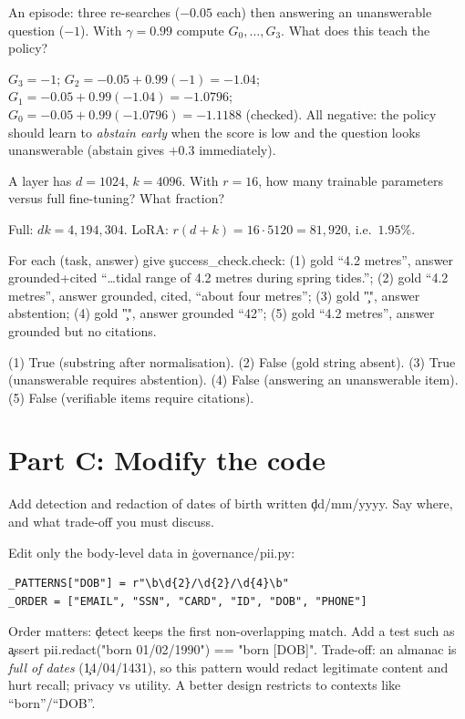 \begin{problem}[RL return]
An episode: three re-searches ($-0.05$ each) then answering an unanswerable question ($-1$). With $\gamma=0.99$ compute $G_0,\dots,G_3$. What does this teach the policy?
\end{problem}
\begin{solution}
$G_3=-1$; $G_2=-0.05+0.99(-1)=-1.04$; $G_1=-0.05+0.99(-1.04)=-1.0796$; $G_0=-0.05+0.99(-1.0796)=-1.1188$ (checked). All negative: the policy should learn to \emph{abstain early} when the score is low and the question looks unanswerable (abstain gives $+0.3$ immediately).
\end{solution}

\begin{problem}[LoRA]
A layer has $d=1024$, $k=4096$. With $r=16$, how many trainable parameters versus full fine-tuning? What fraction?
\end{problem}
\begin{solution}
Full: $dk=4{,}194{,}304$. LoRA: $r(d+k)=16\cdot5120=81{,}920$, i.e.\ $1.95\%$.
\end{solution}

\begin{problem}[Verifier]
For each (task, answer) give \c{success\_check.check}: (1) gold ``4.2 metres'', answer grounded+cited ``\ldots tidal range of 4.2 metres during spring tides.''; (2) gold ``4.2 metres'', answer grounded, cited, ``about four metres''; (3) gold \c{""}, answer abstention; (4) gold \c{""}, answer grounded ``42''; (5) gold ``4.2 metres'', answer grounded but no citations.
\end{problem}
\begin{solution}
(1) True (substring after normalisation). (2) False (gold string absent). (3) True (unanswerable requires abstention). (4) False (answering an unanswerable item). (5) False (verifiable items require citations).
\end{solution}

\section*{Part C: Modify the code}
\begin{problem}
Add detection and redaction of dates of birth written \c{dd/mm/yyyy}. Say where, and what trade-off you must discuss.
\end{problem}
\begin{solution}
Edit only the body-level data in \c{governance/pii.py}:
\begin{lstlisting}
_PATTERNS["DOB"] = r"\b\d{2}/\d{2}/\d{4}\b"
_ORDER = ["EMAIL", "SSN", "CARD", "ID", "DOB", "PHONE"]
\end{lstlisting}
Order matters: \c{detect} keeps the first non-overlapping match. Add a test such as \c{assert pii.redact("born 01/02/1990") == "born [DOB]"}. Trade-off: an almanac is \emph{full of dates} (\c{14/04/1431}), so this pattern would redact legitimate content and hurt recall; privacy vs utility. A better design restricts to contexts like ``born''/``DOB''.
\end{solution}

